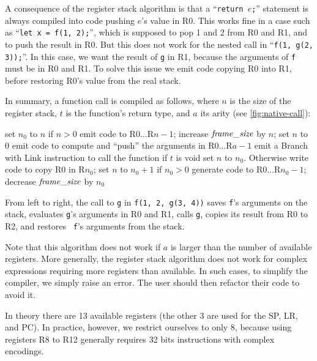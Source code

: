 A consequence of the register stack algorithm is that a ``{\tt return $e$;}''
statement is always compiled into code pushing $e$'s value in R0. This works
fine in a case such as ``{\tt let x = f(1, 2);}'', which is supposed to pop 1
and 2 from R0 and R1, and to push the result in R0. But this does not work for
the nested call in ``{\tt f(1, g(2, 3));}''. In this case, we want the result
of {\tt g} in R1, because the arguments of {\tt f} must be in R0 and R1. To
solve this issue we emit code copying R0 into R1, before restoring R0's value
from the real stack.

In summary, a function call is compiled as follows, where $n$
is the size of the register stack, $t$ is the function's return type, and $a$
its arity (see \cref{fig:native-call}):
\begin{algorithmic}[1]
\State set $n_0$ to $n$
\State if $n>0$ emit code to  R0$\ldots$R$n-1$; increase
$\it{frame\_size}$
by $n$; set $n$ to 0
\State emit code to compute and ``push'' the arguments in R0$\ldots$R$a-1$
\State emit a Branch with Link instruction to call the function
\State if $t$ is void set $n$ to $n_0$. Otherwise write code to copy R0 in
R$n_0$; set $n$ to $n_0+1$
\State if $n_0>0$ generate code to  R0$\ldots$R$n_0-1$; decrease
$\it{frame\_size}$ by $n_0$
\end{algorithmic}

\begin{Figure}
  

  \caption{From left to right, the call to {\tt g} in {\tt f(1, 2, g(3, 4))}
  saves {\tt f}'s arguments on the stack, evaluates {\tt g}'s arguments in R0
  and R1, calls {\tt g}, copies its result from R0 to R2, and restores {\tt
  f}'s arguments from the stack.}\label{fig:native-call}
\end{Figure}

Note that this algorithm does not work if $a$ is larger than the number of
available registers. More generally, the register stack algorithm does not work
for complex expressions requiring more registers than available. In such cases,
to simplify the compiler, we simply raise an error. The user should then
refactor their code to avoid it.

In theory there are 13 available registers (the other 3 are used for the SP,
LR, and PC). In practice, however, we restrict ourselves to only 8, because
using registers R8 to R12 generally requires 32 bits instructions with complex
encodings.

